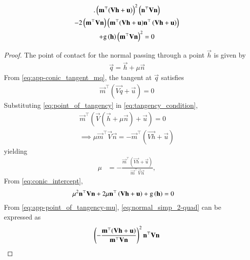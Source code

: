 \begin{enumerate}[label=\thesubsection.\arabic*.,ref=\thesubsection.\theenumi]
\begin{multline}
	\label{eq:app-point_of_tangency-m}.
	\left( {\mathbf{m}^\top(\mathbf{Vh}+\mathbf{u})}\right)^2\left(\mathbf{n}^{\top}\mathbf{V}\mathbf{n}\right) 
	\\
	- 2\left(\mathbf{m}^\top\mathbf{V}\mathbf{n}\right) \left( {\mathbf{m}^\top(\mathbf{Vh}+\mathbf{u})}\mathbf{n}^{\top}\left(\mathbf{V}\mathbf{h}+\mathbf{u}\right)\right) 
	\\
+  \text{g}\left(
  \mathbf{h}
	  \right)\left(\mathbf{m}^\top\mathbf{V}\mathbf{n}\right)^2
	= 0
\end{multline}
\begin{proof}
The point of contact for the normal passing through a point $\vec{h}$ is given by 
\begin{align}
	\label{eq:point_of_tangency}
	\vec{q} = \vec{h} + \mu\vec{n}
\end{align}
From 
  \eqref{eq:app-conic_tangent_mq},
	the tangent at $\vec{q}$ satisfies 
\begin{align}
	\label{eq:tangency_condition}
	\vec{m}^\top(\vec{Vq}+\vec{u}) = 0
\end{align}
Substituting \eqref{eq:point_of_tangency} in \eqref{eq:tangency_condition},
\begin{align}
	\label{eq:normal_simp_1}
	\vec{m}^\top(\vec{V}(\vec{h}+\mu\vec{n})+\vec{u}) = 0\\
	\label{eq:normal_simp_2}
	\implies \mu\vec{m}^\top\vec{V}\vec{n} = -\vec{m}^\top(\vec{Vh}+\vec{u})
\end{align}
yielding 
\begin{align}
	\label{eq:app-point_of_tangency-mu}
	\mu &=- \frac  {\vec{m}^\top(\vec{Vh}+\vec{u})}{\vec{m}^\top\vec{V}\vec{n}},
\end{align}
	From 
\eqref{eq:conic_intercept},
\begin{align}
	\label{eq:normal_simp_2-quad}
\mu^2\mathbf{n}^{\top}\mathbf{V}\mathbf{n} + 2 \mu\mathbf{n}^{\top}\left(\mathbf{V}\mathbf{h}+\mathbf{u}\right) 
+  \text{g}\left(
  \mathbf{h}
	  \right)
	&= 0
\end{align}
From 
	\eqref{eq:app-point_of_tangency-mu},
	\eqref{eq:normal_simp_2-quad} can be expressed
	as
\begin{multline}
\brak{- \frac{\vec{m}^\top(\vec{Vh}+\vec{u})}{\vec{m}^\top\vec{V}\vec{n}}}^2\vec{n}^{\top}\vec{V}\vec{n} 

\end{multline}
\end{proof}
\end{enumerate}
